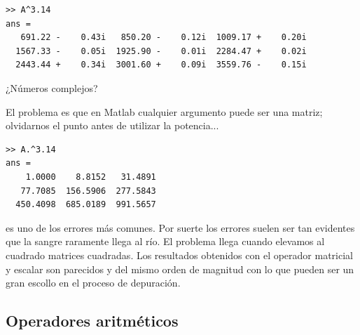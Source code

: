 \begin{lstlisting}
>> A^3.14
ans =
   691.22 -    0.43i   850.20 -    0.12i  1009.17 +    0.20i
  1567.33 -    0.05i  1925.90 -    0.01i  2284.47 +    0.02i
  2443.44 +    0.34i  3001.60 +    0.09i  3559.76 -    0.15i
\end{lstlisting}
¿Números complejos?

El problema es que en Matlab cualquier argumento puede ser una matriz;
olvidarnos el punto antes de utilizar la potencia...

\begin{lstlisting}
>> A.^3.14
ans =
    1.0000    8.8152   31.4891
   77.7085  156.5906  277.5843
  450.4098  685.0189  991.5657
\end{lstlisting}
es uno de los errores más comunes. Por suerte los errores suelen ser
tan evidentes que la sangre raramente llega al río. El problema llega
cuando elevamos al cuadrado matrices cuadradas. Los resultados
obtenidos con el operador matricial y escalar son parecidos y del
mismo orden de magnitud con lo que pueden ser un gran escollo en el
proceso de depuración.


\subsection{Operadores aritméticos}

